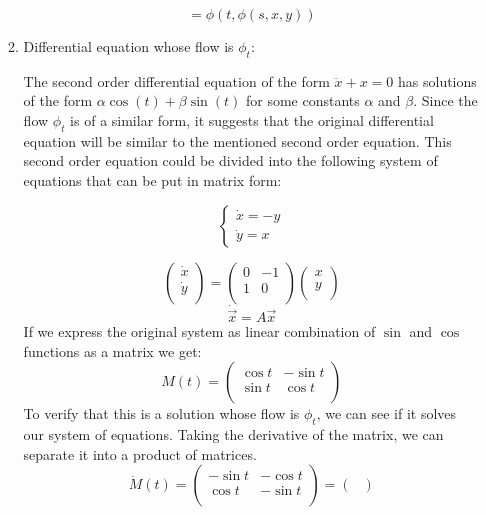 \documentclass[12pt,letterpaper,reqno]{amsart}
\begin{document}
\begin{enumerate}
\begin{enumerate}
$$= \phi(t,\phi(s,x,y))$$
\newpage
    \item Differential equation whose flow is $\phi_t$:\newline
    \begin{flushleft}
    The second order differential equation of the form $\ddot{x} + x = 0$ has solutions of the form $\alpha\cos(t)+\beta\sin(t)$ for some constants $\alpha$ and $\beta$. Since the flow $\phi_t$ is of a similar form, it suggests that the original differential equation will be similar to the mentioned second order equation. This second order equation could be divided into the following system of equations that can be put in matrix form:\newline
    \end{flushleft}
    \[
    \left\{
                \begin{array}{ll}
                  \dot{x} = -y\\
                  \dot{y} = x
                \end{array}
              \right.
  \]
  \begin{flushleft}
  $$\begin{pmatrix}
  \dot{x} \\
  \dot{y} \\
\end{pmatrix} =
\begin{pmatrix}
  0 & -1 \\
  1 & 0 \\
\end{pmatrix}
\begin{pmatrix}
  x \\
  y \\
\end{pmatrix}$$
  $$\dot{\vec{x}} = A\vec{x}$$
If we express the original system as linear combination of $\sin$ and $\cos$ functions as a matrix we get:
$$M(t) = \begin{pmatrix}
  \cos{t} & -\sin{t} \\
  \sin{t} & \cos{t} \\
\end{pmatrix}$$
To verify that this is a solution whose flow is $\phi_t$, we can see if it solves our system of equations. Taking the derivative of the matrix, we can separate it into a product of matrices.
$$\dot{M}(t) = \begin{pmatrix}
  -\sin{t} & -\cos{t} \\
  \cos{t} & -\sin{t} \\
\end{pmatrix} = \begin{pmatrix}

\end{pmatrix}$$
\end{flushleft}
\end{enumerate}
\end{enumerate}
\end{document}
